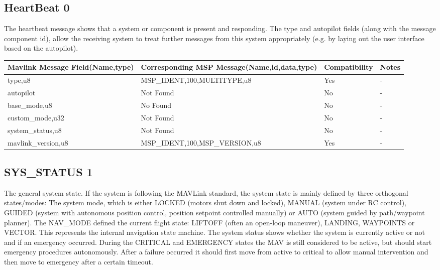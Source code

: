 \subsection{HeartBeat 0} 

The heartbeat message shows that a system or component is present and responding. The type and autopilot fields (along with the message component id), allow the receiving system to treat further messages from this system appropriately (e.g. by laying out the user interface based on the autopilot).  \\

{
\centering
\begin{tabular}{ |p{4cm} |p{7cm} | p{2cm}|m{5em}|}
\hline
Mavlink Message Field(Name,type)&Corresponding MSP Message(Name,id,data,type)& Compatibility & Notes\\
\hline
type,u8 & MSP\_IDENT,100,MULTITYPE,u8  & Yes & - \\
\hline
\rowcolor{yellow}
autopilot & Not Found & No& -\\
\hline
\rowcolor{yellow}
base\_mode,u8 & No Found & No  & -  \\
\hline
\rowcolor{yellow}
custom\_mode,u32& Not Found & No & - \\
\hline
\rowcolor{yellow}
system\_status,u8 & Not Found & No & - \\
\hline
mavlink\_version,u8& MSP\_IDENT,100,MSP\_VERSION,u8  & Yes & - \\
\end{tabular}
}
\cleardoublepage


\subsection{SYS\_STATUS 1} 
The general system state. If the system is following the MAVLink standard, the system state is mainly defined by three orthogonal states/modes: The system mode, which is either LOCKED (motors shut down and locked), MANUAL (system under RC control), GUIDED (system with autonomous position control, position setpoint controlled manually) or AUTO (system guided by path/waypoint planner). The NAV\_MODE defined the current flight state: LIFTOFF (often an open-loop maneuver), LANDING, WAYPOINTS or VECTOR. This represents the internal navigation state machine. The system status shows whether the system is currently active or not and if an emergency occurred. During the CRITICAL and EMERGENCY states the MAV is still considered to be active, but should start emergency procedures autonomously. After a failure occurred it should first move from active to critical to allow manual intervention and then move to emergency after a certain timeout. \\

